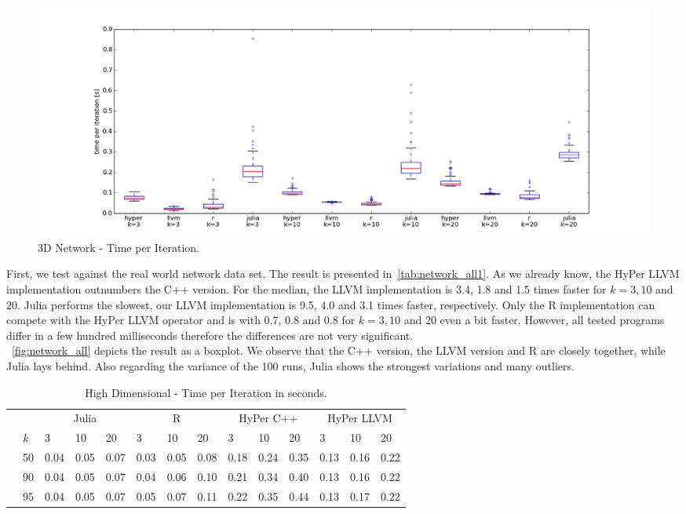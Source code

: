 \begin{figure}[htsb]
  \centerline{
  \includegraphics[scale=0.4, trim="0cm 1cm 0cm 0cm"]{figures/charts/network_all}
  }
  \caption[3D Network - Time per Iteration (Competitors)]{3D Network - Time per Iteration.}
  \label{fig:network_all}
\end{figure}

First, we test against the real world network data set. The result is presented in~\autoref{tab:network_all1}. As we already know, the HyPer LLVM implementation outnumbers the C++ version. For the median, the LLVM implementation is 3.4, 1.8 and 1.5 times faster for $k = 3, 10$ and $20$. Julia performs the slowest, our LLVM implementation is 9.5, 4.0 and 3.1 times faster, respectively. Only the R implementation can compete with the HyPer LLVM operator and is with 0.7, 0.8 and 0.8 for $k = 3, 10$ and 20 even a bit faster. However, all tested programs differ in a few hundred milliseconds therefore the differences are not very significant.
\\
~\autoref{fig:network_all} depicts the result as a boxplot. We observe that the C++ version, the LLVM version and R are closely together, while Julia lays behind. Also regarding the variance of the 100 runs, Julia shows the strongest variations and many outliers.

\begin{table}[htsb]
  \caption[High Dimensional - Time per Iteration (Competitors)]{High Dimensional - Time per Iteration in seconds.}
  \label{tab:highdim_all}
  \centering
  \begin{tabular}{l l l ll |l l l |l l l |l l l}
    \toprule
      && \multicolumn{3}{c}{Julia} & \multicolumn{3}{c}{R} & \multicolumn{3}{c}{HyPer C++} & \multicolumn{3}{c}{HyPer LLVM}  \\
      &\emph{k} & 3 & 10 & 20 & 3 & 10 & 20 & 3 & 10 & 20 & 3 & 10 & 20 \\
    \midrule
      \parbox[t]{2mm}{} &50  & 0.04 & 0.05 & 0.07 & 0.03 & 0.05 & 0.08 & 0.18 & 0.24 & 0.35 & 0.13 & 0.16 & 0.22 \\
      &90  & 0.04 & 0.05 & 0.07 & 0.04 & 0.06 & 0.10 & 0.21 & 0.34 & 0.40 & 0.13 & 0.16 & 0.22 \\
      &95  & 0.04 & 0.05 & 0.07 & 0.05 & 0.07 & 0.11 & 0.22 & 0.35 & 0.44 & 0.13 & 0.17 & 0.22 \\
    \bottomrule
  \end{tabular}
\end{table}

